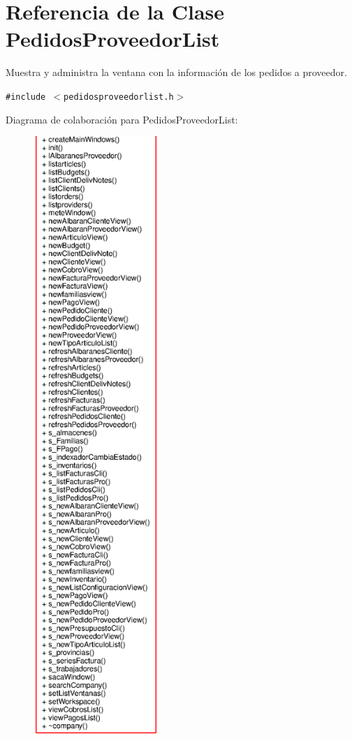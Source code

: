 \section{Referencia de la Clase Pedidos\-Proveedor\-List}
\label{classPedidosProveedorList}
Muestra y administra la ventana con la informaci\'{o}n de los pedidos a proveedor.  


{\tt \#include $<$pedidosproveedorlist.h$>$}

Diagrama de colaboraci\'{o}n para Pedidos\-Proveedor\-List:\begin{figure}[H]
\begin{center}
\leavevmode
\includegraphics[width=134pt]{classPedidosProveedorList__coll__graph}
\end{center}
\end{figure}
